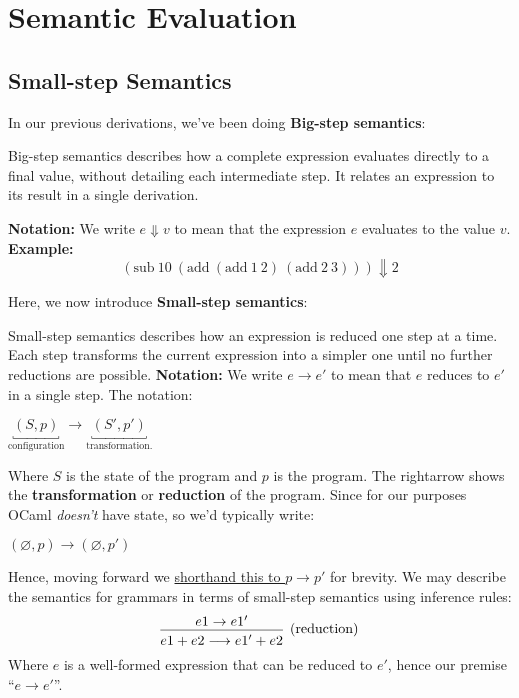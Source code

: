 \section{Semantic Evaluation}
\subsection{Small-step Semantics}

\noindent
In our previous derivations, we've been doing \textbf{Big-step semantics}:

\begin{Def}

    Big-step semantics describes how a complete expression evaluates directly to a final value, without detailing each intermediate step. It relates an expression to its result in a single derivation.
    
    \medskip
    \noindent\textbf{Notation:} We write $e \Downarrow v$ to mean that the expression $e$ evaluates to the value $v$.\\
    \noindent\textbf{Example:}
    \[
    (\text{sub}\ 10\ (\text{add}\ (\text{add}\ 1\ 2)\ (\text{add}\ 2\ 3))) \Downarrow 2
    \]
    \end{Def}

\noindent
Here, we now introduce \textbf{Small-step semantics}:

\begin{Def}

    Small-step semantics describes how an expression is reduced one step at a time. Each step transforms the current expression into a simpler one until no further reductions are possible.
    \noindent\textbf{Notation:} We write $e \rightarrow e'$ to mean that $e$ reduces to $e'$ in a single step.
    The notation:
    \begin{center}
    \LARGE
    $\underbracket{(S,p)}_{\text{configuration}} \longrightarrow \underbracket{(S',p')}_{\text{transformation.}}$
    \normalsize
    \end{center}
    \noindent
    Where $S$ is the state of the program and $p$ is the program. The rightarrow shows the \textbf{transformation} or \textbf{reduction} of the program. Since
    for our purposes OCaml \textit{doesn't} have state, so we'd typically write:
    \begin{center}
    \LARGE
    $(\varnothing, p) \longrightarrow (\varnothing,p')$
    \normalsize
    \end{center}
    \noindent
    Hence, moving forward we \underline{shorthand this to $p \rightarrow p'$} for brevity. We may describe the semantics for 
    grammars in terms of small-step semantics using inference rules:
    \Large
    \[
    \begin{prooftree}
    \hypo{e1 \rightarrow e1'}
    \Infer1[(\text{reduction})]{e1 + e2 \longrightarrow e1' + e2}
    \end{prooftree}
    \]
    \normalsize
    \noindent
    Where $e$ is a well-formed expression that can be reduced to $e'$, hence our premise ``$e \rightarrow e'$''.

\end{Def}

